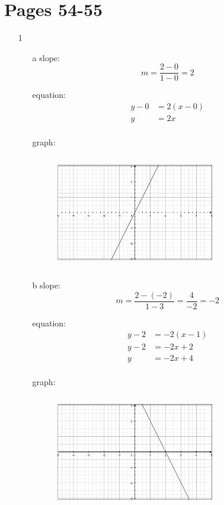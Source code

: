 \documentclass[fleqn,addpoints]{exam}
\begin{document}
\ifprintanswers

\section{Pages 54-55}
\begin{itemize}

\item[1]
\begin{itemize}

\item[a]
slope:
\[
  m = \frac{2-0}{1-0} = 2
\]

equation:
\begin{align*}
  y - 0 &= 2(x-0) \\
  y &= 2x \\
\end{align*}

graph:
\begin{figure}[H]
  \includegraphics[width=7cm,height=5cm]{1.7-1a.eps}
\end{figure}

\item[b]
slope:
\[
  m = \frac{2- (-2)}{1-3} = \frac{4}{-2} = -2
\]

equation:
\begin{align*}
  y - 2 &= -2(x-1) \\
  y - 2 &= -2x + 2 \\
  y &= -2x + 4 \\
\end{align*}

graph:
\begin{figure}[H]
  \includegraphics[width=7cm,height=5cm]{1.7-1b.eps}
\end{figure}


\end{itemize}
\end{itemize}
\end{document}
